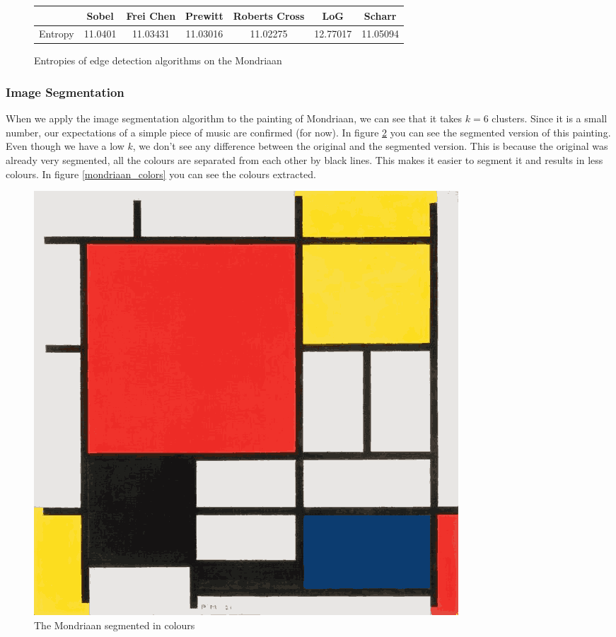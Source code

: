 \documentclass[12pt]{article}
\begin{document}
\begin{figure}
\begin{tabular}{| c | c | c | c | c | c | c |}
\hline
& Sobel & Frei Chen & Prewitt & Roberts Cross & LoG & Scharr \\
\hline
Entropy & 11.0401 & 11.03431 & 11.03016 & 11.02275 & 12.77017 & 11.05094 \\ 
\hline
\end{tabular}
\caption{Entropies of edge detection algorithms on the Mondriaan}
\label{mondriaan_entropy}
\end{figure} 

\subsubsection{Image Segmentation}

When we apply the image segmentation algorithm to the painting of Mondriaan, we can see that it takes $k = 6$ clusters. Since it is a small number, our expectations of a simple piece of music are confirmed (for now). In figure \ref{mondriaan_segmented} you can see the segmented version of this painting. Even though we have a low $k$, we don't see any difference between the original and the segmented version. This is because the original was already very segmented, all the colours are separated from each other by black lines. This makes it easier to segment it and results in less colours. In figure \ref{mondriaan_colors} you can see the colours extracted.  

\begin{figure}[H]
\centering
\includegraphics[scale = 0.4]{img/mondriaan_segmented}
\caption{The Mondriaan segmented in colours}
\label{mondriaan_segmented}
\end{figure}
\end{document}
